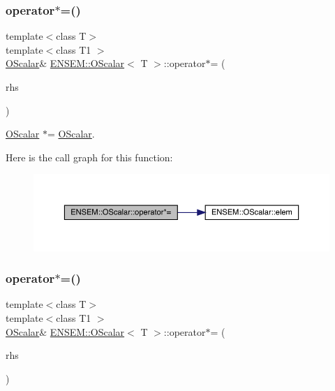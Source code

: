 \subsubsection{\texorpdfstring{operator$\ast$=()}{operator*=()}\hspace{0.1cm}{\footnotesize\ttfamily [2/3]}}
{\footnotesize\ttfamily template$<$class T$>$ \\
template$<$class T1 $>$ \\
\mbox{\hyperlink{classENSEM_1_1OScalar}{O\+Scalar}}\& \mbox{\hyperlink{classENSEM_1_1OScalar}{E\+N\+S\+E\+M\+::\+O\+Scalar}}$<$ T $>$\+::operator$\ast$= (\begin{DoxyParamCaption}\item[{const \mbox{\hyperlink{classENSEM_1_1OScalar}{O\+Scalar}}$<$ T1 $>$ \&}]{rhs }\end{DoxyParamCaption})\hspace{0.3cm}{\ttfamily [inline]}}



\mbox{\hyperlink{classENSEM_1_1OScalar}{O\+Scalar}} $\ast$= \mbox{\hyperlink{classENSEM_1_1OScalar}{O\+Scalar}}. 

Here is the call graph for this function\+:
\nopagebreak
\begin{figure}[H]
\begin{center}
\leavevmode
\includegraphics[width=350pt]{da/d80/classENSEM_1_1OScalar_a9977cd15ef5da689d65713ddf0768085_cgraph}
\end{center}
\end{figure}
\mbox{\label{classENSEM_1_1OScalar_a9977cd15ef5da689d65713ddf0768085}} 
\subsubsection{\texorpdfstring{operator$\ast$=()}{operator*=()}\hspace{0.1cm}{\footnotesize\ttfamily [3/3]}}
{\footnotesize\ttfamily template$<$class T$>$ \\
template$<$class T1 $>$ \\
\mbox{\hyperlink{classENSEM_1_1OScalar}{O\+Scalar}}\& \mbox{\hyperlink{classENSEM_1_1OScalar}{E\+N\+S\+E\+M\+::\+O\+Scalar}}$<$ T $>$\+::operator$\ast$= (\begin{DoxyParamCaption}\item[{const \mbox{\hyperlink{classENSEM_1_1OScalar}{O\+Scalar}}$<$ T1 $>$ \&}]{rhs }\end{DoxyParamCaption})\hspace{0.3cm}{\ttfamily [inline]}}



